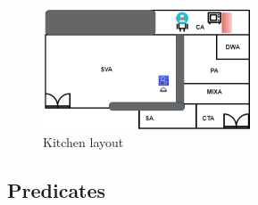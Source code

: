 \documentclass{article}
\begin{document}
\vspace{1em}

\begin{figure}[H]
    \centering
    \includegraphics[width=0.55\textwidth]{assets/kitchen-layout.png}
    \caption{Kitchen layout}
    \label{fig:kitchen}
\end{figure}
\newpage
\subsection{Predicates}\label{sec:pred}
\end{document}
